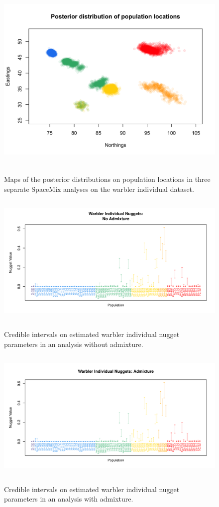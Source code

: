 \documentclass[12pt]{article}
\begin{document}
\begin{figure}
			{\includegraphics[width=5in,height=3.6in]{figs/warblers/warb_inds_ad_post_map_realpr2.png}}
	\caption{Maps of the posterior distributions on population locations in three separate SpaceMix analyses on the warbler individual dataset.}\label{sfig:warb_ind_clouds}
\end{figure}

\begin{figure}
\centering
	{\includegraphics[width=5in,height=2.5in]{figs/warblers/warb_ind_NoAd_nugget.pdf}}
	\caption{Credible intervals on estimated warbler individual nugget parameters in an analysis without admixture.}\label{sfig:warb_ind_noad_nugg}
\end{figure}


\begin{figure}
\centering
	{\includegraphics[width=5in,height=2.5in]{figs/warblers/warb_ind_Ad_nugget.pdf}}
	\caption{Credible intervals on estimated warbler individual nugget parameters in an analysis with admixture.}\label{sfig:warb_ind_ad_nugg}
\end{figure}
\end{document}
